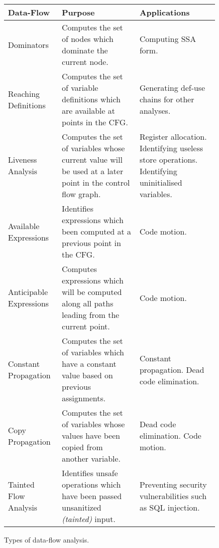 \documentclass[bsc,twoside,singlespacing,parskip,logo,notimes,normalheadings]{infthesis}
\begin{document}
        \begin{figure}[!ht]
          \bgroup
          \def\arraystretch{1.5}%
          \begin{tabular}{|l|p{5cm}|p{5cm}|}
            \hline
	        {\bf Data-Flow}                         & {\bf Purpose}                                                                                              & {\bf Applications}                                                                              \\ \hline
                Dominators                              & Computes the set of nodes which dominate the current node.                                                 & Computing SSA form.                                                                             \\ \hline
                Reaching Definitions                    & Computes the set of variable definitions which are available at points in the CFG.                         & Generating def-use chains for other analyses.                                                   \\ \hline
                Liveness Analysis                       & Computes the set of variables whose current value will be used at a later point in the control flow graph. & Register allocation. Identifying useless store operations. Identifying uninitialised variables. \\ \hline
                Available Expressions                   & Identifies expressions which been computed at a previous point in the CFG.                                 & Code motion.                                                                                    \\ \hline
                Anticipable Expressions                 & Computes expressions which will be computed along all paths leading from the current point.                & Code motion.                                                                                    \\ \hline
                Constant Propagation                    & Computes the set of variables which have a constant value based on previous assignments.                   & Constant propagation. Dead code elimination.                                                    \\ \hline
                Copy Propagation                        & Computes the set of variables whose values have been copied from another variable.                         & Dead code elimination. Code motion.                                                             \\ \hline
                Tainted Flow Analysis\cite{TaintedFlow} & Identifies unsafe operations which have been passed unsanitized {\em (tainted)} input.                     & Preventing security vulnerabilities such as SQL injection.                                      \\ \hline
	  \end{tabular}
          \egroup
          \caption{Types of data-flow analysis.}
          \label{dfatypes}
        \end{figure}
\end{document}
